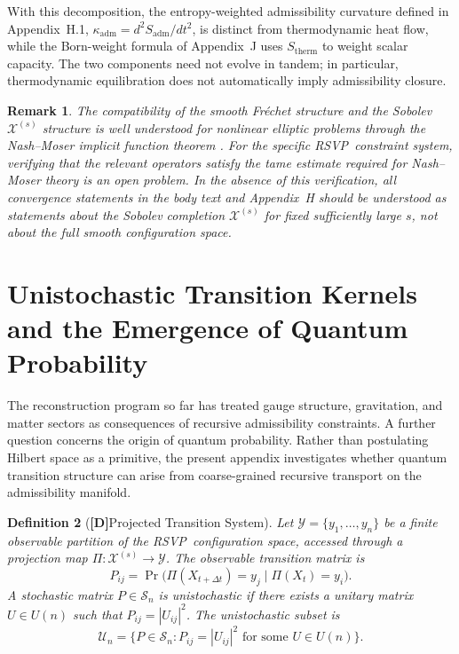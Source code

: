 \documentclass[12pt,a4paper]{article}
\newcommand{\claimD}{\textbf{[D]}\;}
\newtheorem{defn}{Definition}[section]
\newtheorem{appremark}[defn]{Remark}
\newcommand{\RSVP}{\textrm{RSVP}}
\newcommand{\Field}{\mathcal{X}}
\begin{document}
With this decomposition, the entropy-weighted admissibility curvature defined
in Appendix~H.1, $\kappa_\mathrm{adm}=d^2S_\mathrm{adm}/dt^2$, is distinct
from thermodynamic heat flow, while the Born-weight formula of Appendix~J uses
$S_\mathrm{therm}$ to weight scalar capacity. The two components need not evolve
in tandem; in particular, thermodynamic equilibration does not automatically
imply admissibility closure.

\begin{appremark}
The compatibility of the smooth Fr\'{e}chet structure and the Sobolev
$\Field^{(s)}$ structure is well understood for nonlinear elliptic problems
through the Nash--Moser implicit function theorem \cite{Hamilton1982b}. For the
specific \RSVP\ constraint system, verifying that the relevant operators satisfy
the tame estimate required for Nash--Moser theory is an open problem. In the
absence of this verification, all convergence statements in the body text and
Appendix~H should be understood as statements about the Sobolev completion
$\Field^{(s)}$ for fixed sufficiently large $s$, not about the full smooth
configuration space.
\end{appremark}

\section{Unistochastic Transition Kernels and the Emergence of Quantum Probability}

The reconstruction program so far has treated gauge structure, gravitation, and
matter sectors as consequences of recursive admissibility constraints. A further
question concerns the origin of quantum probability. Rather than postulating
Hilbert space as a primitive, the present appendix investigates whether quantum
transition structure can arise from coarse-grained recursive transport on the
admissibility manifold.

\begin{defn}[\claimD Projected Transition System]
Let $\mathcal{Y}=\{y_1,\ldots,y_n\}$ be a finite observable partition of
the \RSVP\ configuration space, accessed through a projection map
$\Pi:\Field^{(s)}\to\mathcal{Y}$. The observable transition matrix is
\[
P_{ij} = \Pr\bigl(\Pi(X_{t+\Delta t})=y_j\mid \Pi(X_t)=y_i\bigr).
\]
A stochastic matrix $P\in\mathcal{S}_n$ is \emph{unistochastic} if there
exists a unitary matrix $U\in U(n)$ such that $P_{ij}=|U_{ij}|^2$.
The \emph{unistochastic subset} is
\[
\mathcal{U}_n = \{P\in\mathcal{S}_n : P_{ij}=|U_{ij}|^2 \text{ for some } U\in U(n)\}.
\]
\end{defn}
\end{document}
